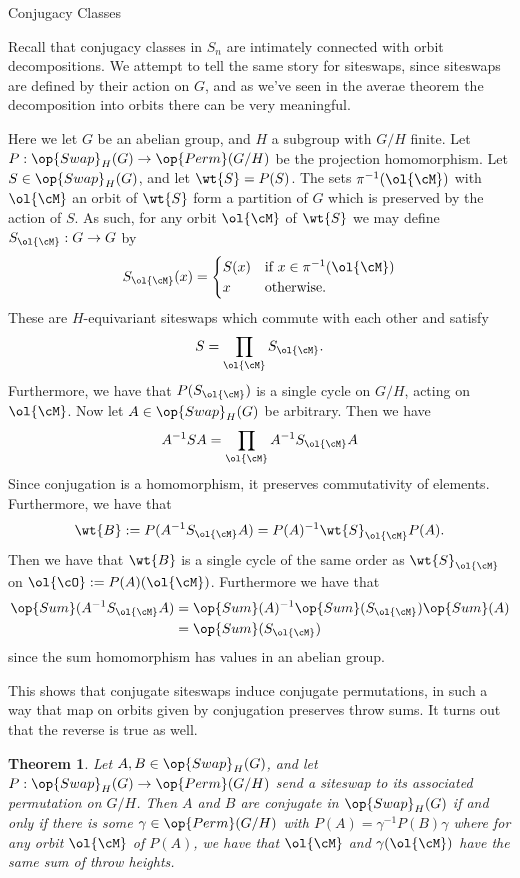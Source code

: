 \documentclass[12nt]{article}
\theoremstyle{plain}
\newtheorem{theorem}{Theorem}
\begin{document}
\begin{subsection}{Conjugacy Classes}

	Recall that conjugacy classes in $S_n$ are intimately connected with orbit decompositions. We attempt to tell the same story for siteswaps, since siteswaps are defined by their action on $G$, and as we've seen in the averae theorem the decomposition into orbits there can be very meaningful.
	
	Here we let $G$ be an abelian group, and $H$ a subgroup with $G/H$ finite. Let $P : \op{Swap}_H(G) \to \op{Perm}(G/H)$ be the projection homomorphism. Let $S \in \op{Swap}_H(G)$, and let $\wt{S} = P(S)$. The sets $\pi^{-1}(\ol{\cM})$ with $\ol{\cM}$ an orbit of $\wt{S}$ form a partition of $G$ which is preserved by the action of $S$. As such, for any orbit $\ol{\cM}$ of $\wt{S}$ we may define $S_{\ol{\cM}} : G \to G$ by
	\[
		S_{\ol{\cM}}(x) = \begin{cases}
			S(x) & \text{if } x \in \pi^{-1}(\ol{\cM}) \\
			x & \text{otherwise.}
		\end{cases}
	\]
	These are $H$-equivariant siteswaps which commute with each other and satisfy
	\[
		S = \prod \limits_{\ol{\cM}} S_{\ol{\cM}}.
	\]
	Furthermore, we have that $P(S_{\ol{\cM}})$ is a single cycle on $G/H$, acting on $\ol{\cM}$.
	Now let $A \in \op{Swap}_H(G)$ be arbitrary. Then we have
	\[
		A^{-1}SA = \prod \limits_{\ol{\cM}} A^{-1}S_{\ol{\cM}}A
	\]
	Since conjugation is a homomorphism, it preserves commutativity of elements. Furthermore, we have that
	\[
		\wt{B} := P(A^{-1}S_{\ol{\cM}}A) = P(A)^{-1}\wt{S}_{\ol{\cM}}P(A).
	\]
	Then we have that $\wt{B}$ is a single cycle of the same order as $\wt{S}_{\ol{\cM}}$ on $\ol{\cO} := P(A)(\ol{\cM})$. Furthermore we have that
	\begin{align*}
		\op{Sum}(A^{-1}S_{\ol{\cM}}A) &= \op{Sum}(A)^{-1}\op{Sum}(S_{\ol{\cM}}) \op{Sum}(A) \\
			&= \op{Sum}(S_{\ol{\cM}})
	\end{align*}
	since the sum homomorphism has values in an abelian group.

	This shows that conjugate siteswaps induce conjugate permutations, in such a way that map on orbits given by conjugation preserves throw sums. It turns out that the reverse is true as well. 

	\begin{theorem}
		Let $A, B \in \op{Swap}_H(G)$, and let $P : \op{Swap}_H(G) \to \op{Perm}(G/H)$ send a siteswap to its associated permutation on $G/H$. Then $A$ and $B$ are conjugate in $\op{Swap}_H(G)$ if and only if there is some $\gamma \in \op{Perm}(G/H)$ with $P(A) = \gamma^{-1}P(B)\gamma$ where for any orbit $\ol{\cM}$ of $P(A)$, we have that $\ol{\cM}$ and $\gamma(\ol{\cM})$ have the same sum of throw heights.
		

\end{theorem}
\end{subsection}
\end{document}
